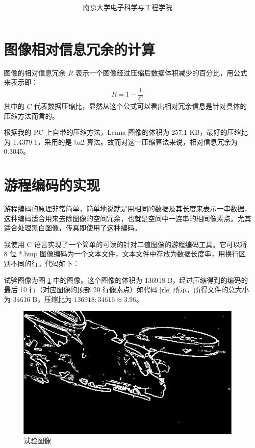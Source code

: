 \documentclass[a4paper,10pt]{article}
\theoremstyle{definition}
\theoremstyle{plain}
\begin{document}
\title{\Title \titlename\\  \vicetitle}
\author{ 南京大学电子科学与工程学院\\   \myauthor} 
\maketitle

\section{图像相对信息冗余的计算}
图像的相对信息冗余 $R$ 表示一个图像经过压缩后数据体积减少的百分比，用公式来表示即：
\begin{equation*}
R=1-\frac{1}{C}
\end{equation*}
其中的 $C$ 代表数据压缩比，显然从这个公式可以看出相对冗余信息是针对具体的压缩方法而言的。

根据我的 PC 上自带的压缩方法，Lenna 图像的体积为 257.1 KB，最好的压缩比为 1.4379:1，采用的是 bz2 算法。故而对这一压缩算法来说，相对信息冗余为 0.3045。
\section{游程编码的实现}
游程编码的原理非常简单，简单地说就是用相同的数据及其长度来表示一串数据，这种编码适合用来去除图像的空间冗余，也就是空间中一连串的相同像素点。尤其适合处理黑白图像，传真即使用了这种编码。

我使用 C 语言实现了一个简单的可读的针对二值图像的游程编码工具。它可以将 8 位 *.bmp 图像编码为一个文本文件，文本文件中存放为数据长度串，用换行区别不同的行。代码如下：


试验图像为图 \ref{exp} 中的图像。这个图像的体积为 136918 B，经过压缩得到的编码的最后 10 行（对应图像的顶部 20 行像素点）如代码 \ref{rle} 所示，所得文件的总大小为 34616 B，压缩比为 $136918:34616\approx3.96$。

\begin{figure}[htbp]
\centering
\includegraphics[scale=.8]{f2.jpg}
\caption{试验图像\label{exp}}
\end{figure}
\end{document}
